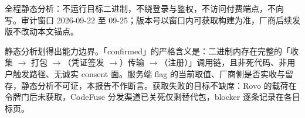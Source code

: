 全程静态分析：不运行目标二进制，不绕登录与鉴权，不访问付费端点，不向  写。审计窗口 2026-09-22 至 09-25；版本号以窗口内可获取构建为准，厂商后续发版不改动本文锚点。

静态分析划得出能力边界。「confirmed」的严格含义是：二进制内存在完整的「收集 $\to$ 打包 $\to$（凭证签发 $\to$）传输 $\to$（注册）」调用链，且非死代码、非用户触发路径、无诚实 consent 面。服务端 flag 的当前取值、厂商侧是否实收与留存，静态分析不可证，本报告不作断言。获取失败的目标不缺席：Rovo 的载荷在  令牌门后未获取，CodeFuse 分发渠道已关死仅剩替代包，blocker 逐条记录在各目标页。

